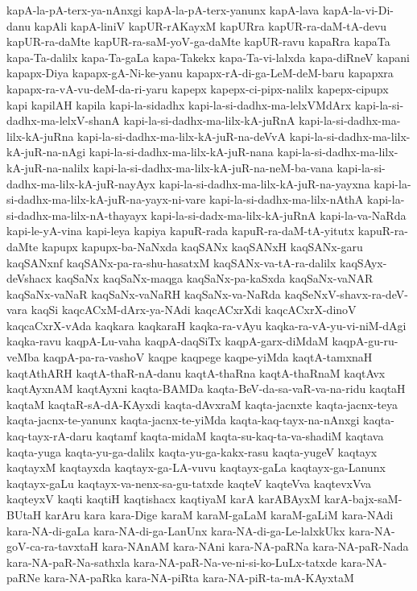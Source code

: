 {kapA-la-pA-terx-ya-nAnxgi
kapA-la-pA-terx-yanunx
kapA-lava
kapA-la-vi-Di-danu
kapAli
kapA-liniV
kapUR-rAKayxM
kapURra
kapUR-ra-daM-tA-devu
kapUR-ra-daMte
kapUR-ra-saM-yoV-ga-daMte
kapUR-ravu
kapaRra
kapaTa
kapa-Ta-dalilx
kapa-Ta-gaLa
kapa-Takekx
kapa-Ta-vi-lalxda
kapa-diRneV
kapani
kapapx-Diya
kapapx-gA-Ni-ke-yanu
kapapx-rA-di-ga-LeM-deM-baru
kapapxra
kapapx-ra-vA-vu-deM-da-ri-yaru
kapepx
kapepx-ci-pipx-nalilx
kapepx-cipupx
kapi
kapilAH
kapila
kapi-la-sidadhx
kapi-la-si-dadhx-ma-lelxVMdArx
kapi-la-si-dadhx-ma-lelxV-shanA
kapi-la-si-dadhx-ma-lilx-kA-juRnA
kapi-la-si-dadhx-ma-lilx-kA-juRna
kapi-la-si-dadhx-ma-lilx-kA-juR-na-deVvA
kapi-la-si-dadhx-ma-lilx-kA-juR-na-nAgi
kapi-la-si-dadhx-ma-lilx-kA-juR-nana
kapi-la-si-dadhx-ma-lilx-kA-juR-na-nalilx
kapi-la-si-dadhx-ma-lilx-kA-juR-na-neM-ba-vana
kapi-la-si-dadhx-ma-lilx-kA-juR-nayAyx
kapi-la-si-dadhx-ma-lilx-kA-juR-na-yayxna
kapi-la-si-dadhx-ma-lilx-kA-juR-na-yayx-ni-vare
kapi-la-si-dadhx-ma-lilx-nAthA
kapi-la-si-dadhx-ma-lilx-nA-thayayx
kapi-la-si-dadx-ma-lilx-kA-juRnA
kapi-la-va-NaRda
kapi-le-yA-vina
kapi-leya
kapiya
kapuR-rada
kapuR-ra-daM-tA-yitutx
kapuR-ra-daMte
kapupx
kapupx-ba-NaNxda
kaqSANx
kaqSANxH
kaqSANx-garu
kaqSANxnf
kaqSANx-pa-ra-shu-hasatxM
kaqSANx-va-tA-ra-dalilx
kaqSAyx-deVshacx
kaqSaNx
kaqSaNx-maqga
kaqSaNx-pa-kaSxda
kaqSaNx-vaNAR
kaqSaNx-vaNaR
kaqSaNx-vaNaRH
kaqSaNx-va-NaRda
kaqSeNxV-shavx-ra-deV-vara
kaqSi
kaqcACxM-dArx-ya-NAdi
kaqcACxrXdi
kaqcACxrX-dinoV
kaqcaCxrX-vAda
kaqkara
kaqkaraH
kaqka-ra-vAyu
kaqka-ra-vA-yu-vi-niM-dAgi
kaqka-ravu
kaqpA-Lu-vaha
kaqpA-daqSiTx
kaqpA-garx-diMdaM
kaqpA-gu-ru-veMba
kaqpA-pa-ra-vashoV
kaqpe
kaqpege
kaqpe-yiMda
kaqtA-tamxnaH
kaqtAthARH
kaqtA-thaR-nA-danu
kaqtA-thaRna
kaqtA-thaRnaM
kaqtAvx
kaqtAyxnAM
kaqtAyxni
kaqta-BAMDa
kaqta-BeV-da-sa-vaR-va-na-ridu
kaqtaH
kaqtaM
kaqtaR-sA-dA-KAyxdi
kaqta-dAvxraM
kaqta-jacnxte
kaqta-jacnx-teya
kaqta-jacnx-te-yanunx
kaqta-jacnx-te-yiMda
kaqta-kaq-tayx-na-nAnxgi
kaqta-kaq-tayx-rA-daru
kaqtamf
kaqta-midaM
kaqta-su-kaq-ta-va-shadiM
kaqtava
kaqta-yuga
kaqta-yu-ga-dalilx
kaqta-yu-ga-kakx-rasu
kaqta-yugeV
kaqtayx
kaqtayxM
kaqtayxda
kaqtayx-ga-LA-vuvu
kaqtayx-gaLa
kaqtayx-ga-Lanunx
kaqtayx-gaLu
kaqtayx-va-nenx-sa-gu-tatxde
kaqteV
kaqteVva
kaqtevxVva
kaqteyxV
kaqti
kaqtiH
kaqtishacx
kaqtiyaM
karA
karABAyxM
karA-bajx-saM-BUtaH
karAru
kara
kara-Dige
karaM
karaM-gaLaM
karaM-gaLiM
kara-NAdi
kara-NA-di-gaLa
kara-NA-di-ga-LanUnx
kara-NA-di-ga-Le-lalxkUkx
kara-NA-goV-ca-ra-tavxtaH
kara-NAnAM
kara-NAni
kara-NA-paRNa
kara-NA-paR-Nada
kara-NA-paR-Na-sathxla
kara-NA-paR-Na-ve-ni-si-ko-LuLx-tatxde
kara-NA-paRNe
kara-NA-paRka
kara-NA-piRta
kara-NA-piR-ta-mA-KAyxtaM
}
